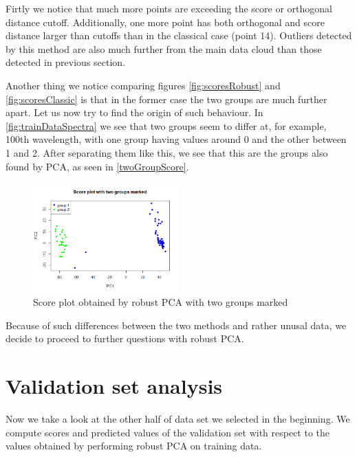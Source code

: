 \documentclass[12pt]{article}
\begin{document}
Firtly we notice that much more points are exceeding the score or orthogonal distance cutoff. 
Additionally, one more point has both orthogonal and score distance larger than cutoffs than in the classical case (point 14). Outliers detected by this method
are also much further from the main data cloud than those detected in previous section.

Another thing we notice comparing figures \ref{fig:scoresRobust} and \ref{fig:scoresClassic} is that in the former case the two groups are much further apart. Let us
now try to find the origin of such behaviour. In \ref{fig:trainDataSpectra} we see that two groups seem to differ at, for example, 100th wavelength, with one group having
values around 0 and the other between 1 and 2. After separating them like this, we see that this are the groups also found by PCA, as seen in \ref{twoGroupScore}.

\begin{figure}
  \begin{center}
    \centering
      \includegraphics[width=0.5\textwidth]{../images/twoGroupScore.png}
      \caption{Score plot obtained by robust PCA with two groups marked}
      \label{fig:twoGroupScore}
  \end{center}
\end{figure}

Because of such differences between the two methods and rather unusal data, we decide to proceed to further questions with robust PCA.

\section{Validation set analysis}
Now we take a look at the other half of data set we selected in the beginning. We compute scores and
predicted values of the validation set with respect to the values obtained by performing robust PCA on training data.
\end{document}
